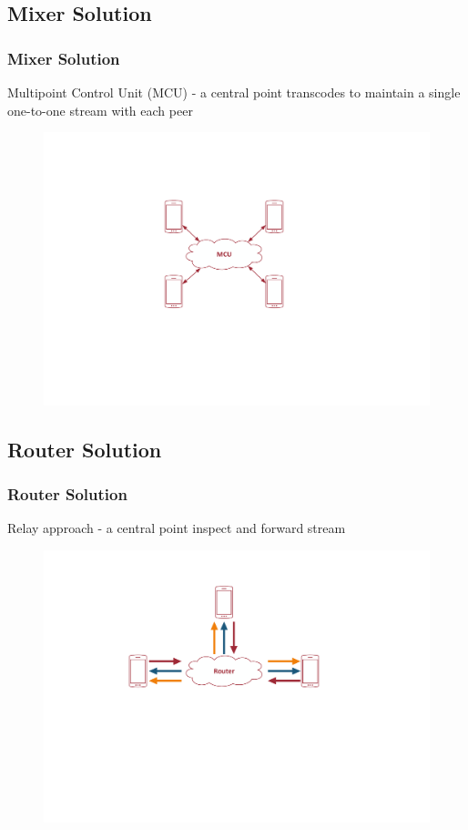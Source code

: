 \documentclass{beamer}
\begin{document}
\subsection{Mixer Solution}
\begin{frame}
	\frametitle{Mixer Solution}
	Multipoint Control Unit (MCU) - a central point transcodes to maintain a single one-to-one stream with each peer
	\begin{figure}[h!]
		\centering
		\includegraphics[scale=0.6]{figs/mcu.pdf}
	\end{figure}
\end{frame}
\subsection{Router Solution}
\begin{frame}
	\frametitle{Router Solution}
	 Relay approach - a central point inspect and forward stream 
	\begin{figure}[h!]
		\centering
		\includegraphics[scale=0.6]{figs/router.pdf}
	\end{figure}
\end{frame}
\end{document}
